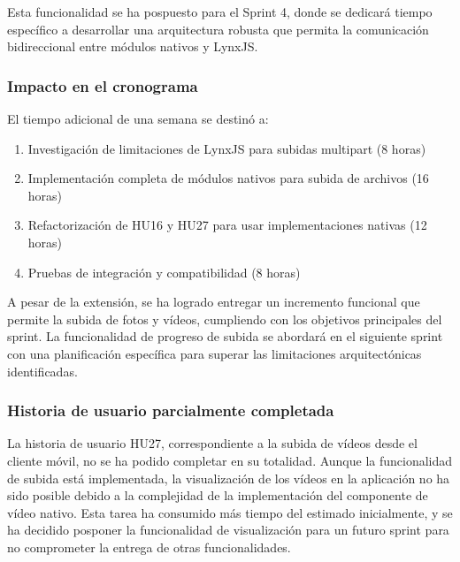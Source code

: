 Esta funcionalidad se ha pospuesto para el Sprint 4, donde se dedicará tiempo específico a desarrollar una arquitectura robusta que permita la comunicación bidireccional entre módulos nativos y LynxJS.

\subsubsection{Impacto en el cronograma}

El tiempo adicional de una semana se destinó a:
\begin{enumerate}
    \item Investigación de limitaciones de LynxJS para subidas multipart (8 horas)
    \item Implementación completa de módulos nativos para subida de archivos (16 horas)
    \item Refactorización de HU16 y HU27 para usar implementaciones nativas (12 horas)
    \item Pruebas de integración y compatibilidad (8 horas)
\end{enumerate}

A pesar de la extensión, se ha logrado entregar un incremento funcional que permite la subida de fotos y vídeos, cumpliendo con los objetivos principales del sprint. La funcionalidad de progreso de subida se abordará en el siguiente sprint con una planificación específica para superar las limitaciones arquitectónicas identificadas.

\subsubsection{Historia de usuario parcialmente completada}

La historia de usuario HU27, correspondiente a la subida de vídeos desde el cliente móvil, no se ha podido completar en su totalidad. Aunque la funcionalidad de subida está implementada, la visualización de los vídeos en la aplicación no ha sido posible debido a la complejidad de la implementación del componente de vídeo nativo. Esta tarea ha consumido más tiempo del estimado inicialmente, y se ha decidido posponer la funcionalidad de visualización para un futuro sprint para no comprometer la entrega de otras funcionalidades.
